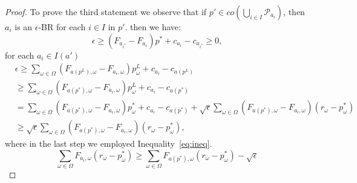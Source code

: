 \begin{proof}
     To prove the third statement we observe that if $p' \in co(\bigcup_{i \in I} \mathcal{P}_{a_i})$, then $a_i$ is an $\epsilon$-BR for each $i \in I$ in $p'$. then we have:
     \begin{equation}\label{eq:ineq}
          \epsilon \ge (F_{a_{i^*}} - F_{a_i} ) p^* + c_{a_i}- c_{a_{i^*}} \ge 0,
      \end{equation}
      for each $a_i \in I(a')$
      \begin{align*}
          & \epsilon \ge \sum_{\omega \in \Omega }(F_{a(p^L),\omega} - F_{a_i,\omega} ) p^L_\omega + c_{a_i}- c_{a(p^L)} \\
          & \ge \sum_{\omega \in \Omega }(F_{a(p^*),\omega} - F_{a_i,\omega} ) p^L_\omega + c_{a_i}- c_{a(p^*)} \\
          & = \sum_{\omega \in \Omega }(F_{a(p^*),\omega} - F_{a_i,\omega} ) p^*_\omega  + c_{a_i}- c_{a(p^*)} + \sqrt{\epsilon} \sum_{\omega \in \Omega } (F_{a(p^*),\omega} - F_{a_i,\omega} ) ( r_\omega - p^*_\omega )\\
          & \ge \sqrt{\epsilon} \sum_{\omega \in \Omega } (F_{a(p^*),\omega} - F_{a_i,\omega} ) ( r_\omega - p^*_\omega ),
      \end{align*}
    where in the last step we employed Inequality~\ref{eq:ineq}.
    \begin{equation*}
        \sum_{\omega \in \Omega }F_{a_i,\omega} ( r_\omega - p^*_\omega ) \ge \sum_{\omega \in \Omega }F_{a(p^*),\omega}  ( r_\omega - p^*_\omega )- \sqrt{\epsilon}
    \end{equation*}
\end{proof}


